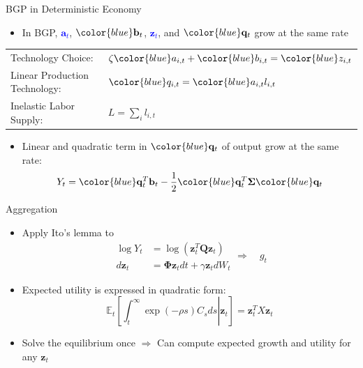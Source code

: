 \documentclass[english,aspectratio=169,handout]{beamer}
\theoremstyle{plain}
\newcommand{\mat}[1]{\bm{#1}}
\begin{document}
\begin{frame}{BGP in Deterministic Economy}
  \begin{itemize}
    \item In BGP, \textcolor{blue}{$\mathbf{a}_{t}$}, ${\color{blue}\mathbf{b}_{t}}$,
          \textcolor{blue}{$\mathbf{z}_{t}$}, and ${\color{blue}\mathbf{q}_{t}}$
          grow at the same rate
  \end{itemize}
    \begin{center}
      \renewcommand{\arraystretch}{1.3}  %
      \begin{tabular}{>{\raggedright\arraybackslash}p{5cm}>{\raggedright\arraybackslash}p{6cm}}
        Technology Choice: & $\zeta{\color{blue}a_{i,t}}+{\color{blue}b_{i,t}}={\color{blue}z_{i,t}}$ \\
        Linear Production Technology: & ${\color{blue}q_{i,t}}={\color{blue}a_{i,t}}l_{i,t}$ \\
        Inelastic Labor Supply: & $L=\sum_{i}l_{i,t}$ \\
      \end{tabular}
      \renewcommand{\arraystretch}{1.0}  %
      \par\end{center}
  \begin{itemize}
    \item Linear and quadratic term in $\color{blue}\mathbf{q}_{t}$ of output grow at the same rate: \hyperlink{summary}{}
          \[
            Y_{t}={\color{blue}\mathbf{q}_{t}^{T}\mathbf{b}_{t}}-\frac{1}{2}{\color{blue}\mathbf{q}_{t}^{T}}\mat{\Sigma}{\color{blue}\mathbf{q}_{t}}
          \]
  \end{itemize}
\end{frame}
%
\begin{frame}{Aggregation}

  \label{aggregation}
  \begin{itemize}
    \item Apply Ito's lemma to \hfill \hyperlink{Y_process}{}
    \[
    \begin{array}{cc}
    \log Y_{t} & =\log\left(\mathbf{z}_{t}^{T}\mat{Q}\mathbf{z}_{t}\right)\\
    d\mathbf{z}_{t} & =\mat{\Phi}\mathbf{z}_{t}dt+\gamma\mathbf{z}_{t}dW_{t}
    \end{array}
    \Longrightarrow \quad g_{t}
    \]
    \item Expected utility is expressed in quadratic form: \hfill \hyperlink{X}{}
          \[
            \mathbb{E}_{t}\left[\left.\int_{t}^{\infty}\exp\left(-\rho s\right)C_{s}ds\right|\mathbf{z}_{t}\right]=\mathbf{z}_{t}^{T}X\mathbf{z}_{t}
          \]
    \item Solve the equilibrium once $\Longrightarrow$ Can compute expected
          growth and utility for any $\mathbf{z}_{t}$
  \end{itemize}
\end{frame}
\end{document}
